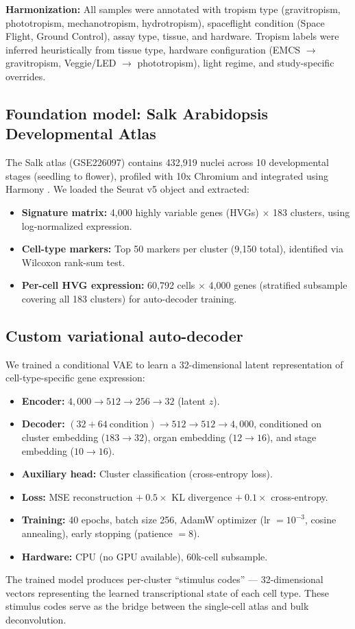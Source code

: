 \documentclass[pdflatex,sn-nature]{sn-jnl}
\begin{document}
\textbf{Harmonization:} All samples were annotated with tropism type
(gravitropism, phototropism, mechanotropism, hydrotropism), spaceflight condition
(Space Flight, Ground Control), assay type, tissue, and hardware. Tropism labels
were inferred heuristically from tissue type, hardware configuration (EMCS \(\to\)
gravitropism, Veggie/LED \(\to\) phototropism), light regime, and study-specific
overrides.

\subsection{Foundation model: Salk Arabidopsis Developmental Atlas}
The Salk atlas (GSE226097) contains 432{,}919 nuclei across 10 developmental
stages (seedling to flower), profiled with 10x Chromium and integrated using
Harmony \cite{salk_atlas}. We loaded the Seurat v5 object and extracted:
\begin{itemize}
  \item \textbf{Signature matrix:} 4{,}000 highly variable genes (HVGs) \(\times\)
    183 clusters, using log-normalized expression.
  \item \textbf{Cell-type markers:} Top 50 markers per cluster (9{,}150 total),
    identified via Wilcoxon rank-sum test.
  \item \textbf{Per-cell HVG expression:} 60{,}792 cells \(\times\) 4{,}000 genes
    (stratified subsample covering all 183 clusters) for auto-decoder training.
\end{itemize}

\subsection{Custom variational auto-decoder}
We trained a conditional VAE to learn a 32-dimensional latent representation of
cell-type-specific gene expression:
\begin{itemize}
  \item \textbf{Encoder:} \(4{,}000 \to 512 \to 256 \to 32\) (latent \(z\)).
  \item \textbf{Decoder:} \((32 + 64\ \text{condition}) \to 512 \to 512 \to
    4{,}000\), conditioned on cluster embedding (\(183 \to 32\)), organ embedding
    (\(12 \to 16\)), and stage embedding (\(10 \to 16\)).
  \item \textbf{Auxiliary head:} Cluster classification (cross-entropy loss).
  \item \textbf{Loss:} MSE reconstruction \(+\ 0.5 \times\) KL divergence \(+\ 0.1
    \times\) cross-entropy.
  \item \textbf{Training:} 40 epochs, batch size 256, AdamW optimizer (lr \(=
    10^{-3}\), cosine annealing), early stopping (patience \(= 8\)).
  \item \textbf{Hardware:} CPU (no GPU available), 60k-cell subsample.
\end{itemize}
The trained model produces per-cluster ``stimulus codes'' --- 32-dimensional
vectors representing the learned transcriptional state of each cell type. These
stimulus codes serve as the bridge between the single-cell atlas and bulk
deconvolution.
\end{document}
